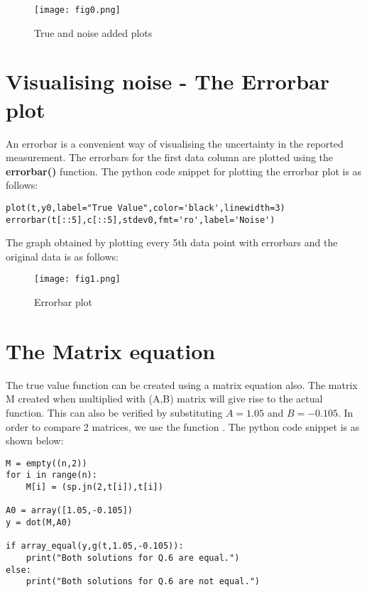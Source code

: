 \documentclass[11pt, a4paper]{article}
\begin{document}
	\begin{figure}[!tbh]
   	\centering
   	\texttt{[image: fig0.png]}   
   	\caption{True and noise added plots}
   \end{figure} 
   
\section{Visualising noise - The Errorbar plot}
An errorbar is a convenient way of visualising the uncertainty in the reported measurement. The errorbars for the first data column are plotted using the \textbf{errorbar()} function. The python code snippet for plotting the errorbar plot is as follows:
\begin{verbatim}	
plot(t,y0,label="True Value",color='black',linewidth=3)
errorbar(t[::5],c[::5],stdev0,fmt='ro',label='Noise')
\end{verbatim}
 The graph obtained by plotting every 5th data point with errorbars and the original data is as follows:   
	\begin{figure}[!tbh]
   	\centering
   	\texttt{[image: fig1.png]}   
   	\caption{Errorbar plot}
   \end{figure} 
  
\section{The Matrix equation}
The true value function can be created using a matrix equation also. The matrix M created when multiplied with (A,B) matrix will give rise to the actual function. This can also be verified by substituting $A=1.05$ and $B=-0.105$. In order to compare 2 matrices, we use the function . The python code snippet is as shown below:
  \begin{verbatim}	
M = empty((n,2))
for i in range(n):
	M[i] = (sp.jn(2,t[i]),t[i])
	
A0 = array([1.05,-0.105])
y = dot(M,A0)

if array_equal(y,g(t,1.05,-0.105)):
	print("Both solutions for Q.6 are equal.")
else:
	print("Both solutions for Q.6 are not equal.")	
\end{verbatim} 
\end{document}

